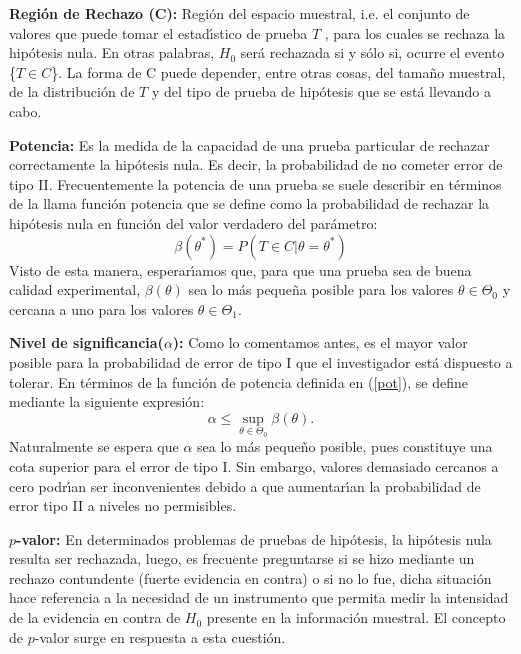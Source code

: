 \documentclass{article}
\theoremstyle{definition}
\begin{document}
\textbf{Región de Rechazo (C): } Región del espacio muestral, i.e. el conjunto de valores que puede
tomar el estadı́stico de prueba $T$ , para los cuales se rechaza la hipótesis nula. En otras palabras,
$H_0$ será rechazada si y sólo si, ocurre el evento \{$T \in C$\}. La forma de C puede depender, entre
otras cosas, del tamaño muestral, de la distribución de $T$ y del tipo de prueba de hipótesis que se
está llevando a cabo.

\textbf{Potencia:} Es la medida de la capacidad de una prueba particular de rechazar correctamente la
hipótesis nula. Es decir, la probabilidad de no cometer error de tipo II. Frecuentemente la potencia de una prueba
se suele describir en términos de la llama función potencia que se define como la probabilidad de
rechazar la hipótesis nula en función del valor verdadero del parámetro:
\begin{equation}
	\beta(\theta^*)=P(T\in C|\theta=\theta^*)\label{pot}
\end{equation}
Visto de esta manera, esperarı́amos que, para que una prueba sea de buena calidad experimental,
$\beta(\theta)$ sea lo más pequeña posible para los valores $\theta\in\Theta_0$  y cercana a uno para los valores $\theta \in \Theta_1$.


\textbf{Nivel de significancia($\alpha$): }Como lo comentamos antes, es el mayor valor posible para la probabilidad de error de tipo I
que el investigador está dispuesto a tolerar. En términos de la función de potencia definida en (\ref{pot}),
se define mediante la siguiente expresión: 
\begin{equation}
	\alpha\leq\sup_{\theta\in\Theta_0} \beta(\theta).
\end{equation}
Naturalmente se espera que $\alpha$ sea lo más pequeño posible, pues constituye una cota superior para
el error de tipo I. Sin embargo, valores demasiado cercanos a cero podrı́an ser inconvenientes
debido a que aumentarı́an la probabilidad de error tipo II a niveles no permisibles.

\textbf{$p$-valor: } En determinados problemas de pruebas de hipótesis, la hipótesis nula resulta ser
rechazada, luego, es frecuente preguntarse si se hizo mediante un rechazo contundente (fuerte evidencia
en contra) o si no lo fue, dicha situación hace referencia a la necesidad de un instrumento que
permita medir la intensidad de la evidencia en contra de $H_0$ presente en la información muestral.
El concepto de $p$-valor surge en respuesta a esta cuestión.
\end{document}
